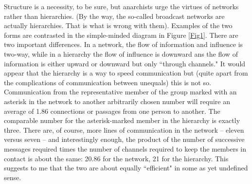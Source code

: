 \documentclass[12pt, onecolumn, letterpaper, oneside]{book}
\begin{document}
Structure is a necessity, to be sure, but anarchists urge the virtues of networks rather than hierarchies. (By the way, the so-called broadcast networks are actually hierarchies. That is what is wrong with them). Examples of the two forms are contrasted in the simple-minded diagram in Figure \ref{Fig1}. There are two important differences. In a network, the flow of information and influence is two-way, while in a hierarchy the flow of influence is downward ans the flow of information is either upward or downward but only ``through channels." It would appear that the hierarchy is a way to speed communication but (quite apart from the complications of communication between unequals) this is not so. Communication from the representative member of the group marked with an asterisk in the network to another arbitrarily chosen number will require an average of 1.86 connections or passages from one person to another. The comparable number for the asterisk-marked member in the hierarchy is exactly three. There are, of course, more lines of communication in the network -- eleven versus seven -- and interestingly enough, the product of the number of successive messages required times the number of channels required to keep the members in contact is about the same: 20.86 for the network, 21 for the hierarchy. This suggests to me that the two are about equally ``efficient" in some as yet undefined sense.\\
\end{document}
